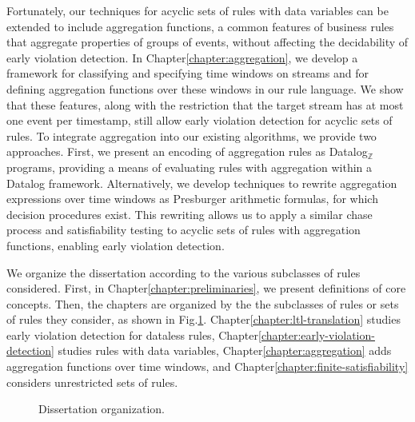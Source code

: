 Fortunately,
our techniques for acyclic sets of rules with data variables
can be extended to include aggregation functions,
a common features of business rules that aggregate properties of groups of events,
without affecting the decidability of early violation detection.
In Chapter\:\ref{chapter:aggregation},
we develop a framework for classifying and specifying time windows
on streams and for defining aggregation functions over these windows
in our rule language.
We show that these features,
along with the restriction that the target stream has at most one event per timestamp,
still allow early violation detection for acyclic sets of rules.
To integrate aggregation into our existing algorithms,
we provide two approaches.
First, we present an encoding of aggregation rules as Datalog$_\mathbb{Z}$ programs,
providing a means of evaluating rules with aggregation within a Datalog framework.
Alternatively, we develop techniques to rewrite aggregation expressions over time windows
as Presburger arithmetic formulas,
for which decision procedures exist.
This rewriting allows us to apply a similar chase process and satisfiability testing
to acyclic sets of rules with aggregation functions,
enabling early violation detection.

We organize the dissertation according to the various subclasses of rules considered.
First,
in Chapter\:\ref{chapter:preliminaries},
we present definitions of core concepts.
Then,
the chapters are organized by the the subclasses of rules or sets of rules
they consider,
as shown in Fig.\:\ref{fig:organization}.
Chapter\:\ref{chapter:ltl-translation} studies early violation detection for dataless rules,
Chapter\:\ref{chapter:early-violation-detection}
studies rules with data variables,
Chapter\:\ref{chapter:aggregation} adds aggregation functions over time windows,
and
Chapter\:\ref{chapter:finite-satisfiability}
considers unrestricted sets of rules.

\begin{figure}
    \centering


\caption{Dissertation organization.}
\label{fig:organization}
\end{figure}

